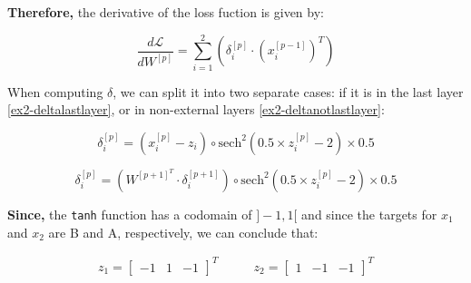 \documentclass[12pt]{article}
\begin{document}
\begin{enumerate}[leftmargin=\labelsep]
          \textbf{Therefore,} the derivative of the loss fuction is given by:

          \begin{equation}\label{ex2-derivate-loss-smiplified}
            \frac{d\mathcal{L}}{dW^{[p]}} = \sum_{i=1}^{2} \left(\delta^{[p]}_i \cdot \left(x^{[p-1]}_i\right)^{T} \right)
          \end{equation}

          When computing \(\delta\), we can split it into two separate cases: if it is in the last layer \eqref{ex2-deltalastlayer}, or in non-external layers \eqref{ex2-deltanotlastlayer}:

          \begin{equation}\label{ex2-deltalastlayer}
              \delta^{[p]}_i = \left(x^{[p]}_i - z_i\right) \circ \text{sech}^{2}\left(0.5 \times z^{[p]}_i - 2\right) \times 0.5
          \end{equation}

          \begin{equation}\label{ex2-deltanotlastlayer}
              \delta^{[p]}_i = \left(W^{[p+1]^{T}} \cdot \delta^{[p+1]}_i\right) \circ \text{sech}^{2}\left(0.5 \times z^{[p]}_i - 2\right) \times 0.5
          \end{equation}

          \textbf{Since,} the \texttt{tanh} function has a codomain of $]-1,1[$ and since the targets for $x_1$ and $x_2$ are B and A, respectively, we can conclude that:

          \vskip -0.3cm
          \[
              \begin{array}{cc}
                  z_1 = \begin{bmatrix} -1 & 1 & -1\end{bmatrix}^T & \qquad
                  z_2 = \begin{bmatrix} 1 & -1 & -1\end{bmatrix}^T
              \end{array}
          \]


\end{enumerate}
\end{document}
